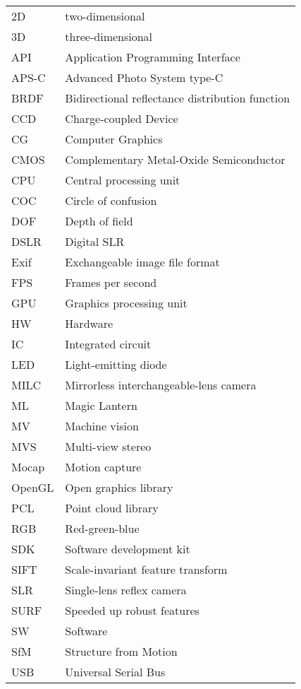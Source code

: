 \begin{tabular}{ll}
	2D & two-dimensional\\
	3D & three-dimensional\\
	API & Application Programming Interface\\
	APS-C & Advanced Photo System type-C\\
	BRDF & Bidirectional reflectance distribution function\\
	CCD & Charge-coupled Device\\
	CG & Computer Graphics\\
	CMOS & Complementary Metal-Oxide Semiconductor\\
	CPU & Central processing unit\\
	COC & Circle of confusion\\
	DOF & Depth of field\\
	DSLR & Digital SLR\\
	Exif & Exchangeable image file format\\
	FPS & Frames per second\\
	GPU & Graphics processing unit\\
	HW & Hardware\\
	IC & Integrated circuit\\
	LED & Light-emitting diode\\
	MILC & Mirrorless interchangeable-lens camera\\
	ML & Magic Lantern\\
	MV & Machine vision\\
	MVS & Multi-view stereo\\
	Mocap & Motion capture\\
	OpenGL & Open graphics library\\
	PCL & Point cloud library\\
	RGB & Red-green-blue\\
	SDK & Software development kit\\
	SIFT & Scale-invariant feature transform\\
	SLR & Single-lens reflex camera\\
	SURF & Speeded up robust features \\
	SW & Software\\
	SfM & Structure from Motion\\
	USB & Universal Serial Bus\\
\end{tabular}

